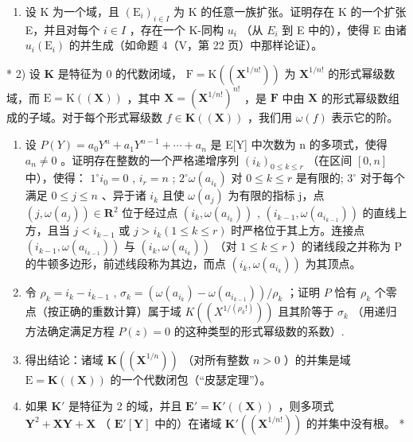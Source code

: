 \BourbakiExerciseGroup

\begin{enumerate}
\def\labelenumi{\arabic{enumi})}
\tightlist
\item
  设 K 为一个域，且 \((\mathrm{E}_{i})_{i\in I}\) 为 K 的任意一族扩张。证明存在 K 的一个扩张 E，并且对每个 \(i\in I\) ，存在一个 K-同构 \(u_{i}\) （从 \(E_{i}\) 到 E 中的），使得 E 由诸 \(u_{i}(\mathrm{E}_{i})\) 的并生成（如命题 4（V，第 22 页）中那样论证）。
\end{enumerate}

* 2) 设 \(\mathbf{K}\) 是特征为 0 的代数闭域， \(\mathrm{F} = \mathrm{K}((\mathbf{X}^{1 / n!}))\) 为 \(\mathbf{X}^{1 / n!}\) 的形式幂级数域，而 \(\mathrm{E} = \mathrm{K}((\mathbf{X}))\) ，其中 \(\mathbf{X} = (\mathbf{X}^{1 / n!})^{n!}\) ，是 \(\mathbf{F}\) 中由 \(\mathbf{X}\) 的形式幂级数组成的子域。对于每个形式幂级数 \(f \in \mathbf{K}((\mathbf{X}))\) ，我们用 \(\omega(f)\) 表示它的阶。

\begin{enumerate}
\def\labelenumi{\alph{enumi})}
\item
  设 \(P(Y) = a_{0}Y^{n} + a_{1}Y^{n-1} + \cdots + a_{n}\) 是 E{[}Y{]} 中次数为 n 的多项式，使得 \(a_{n} \neq 0\) 。证明存在整数的一个严格递增序列 \((i_{k})_{0 \leqslant k \leqslant r}\) （在区间 \([0, n]\) 中），使得： \(1^{\circ} i_{0} = 0\) , \(i_{r} = n\) ; \(2^{\circ} \omega(a_{i_{k}})\) 对 \(0 \leqslant k \leqslant r\) 是有限的; \(3^{\circ}\) 对于每个满足 \(0 \leqslant j \leqslant n\) 、异于诸 \(i_{k}\) 且使 \(\omega(a_{j})\) 为有限的指标 j，点 \((j, \omega(a_{j})) \in \mathbf{R}^{2}\) 位于经过点 \((i_{k}, \omega(a_{i_{k}}))\) , \((i_{k-1}, \omega(a_{i_{k-1}}))\) 的直线上方，且当 \(j < i_{k-1}\) 或 \(j > i_{k} (1 \leqslant k \leqslant r)\) 时严格位于其上方。连接点 \((i_{k-1}, \omega(a_{i_{k-1}}))\) 与 \((i_{k}, \omega(a_{i_{k}}))\) （对 \(1 \leqslant k \leqslant r\) ）的诸线段之并称为 P 的牛顿多边形，前述线段称为其边，而点 \((i_{k}, \omega(a_{i_{k}}))\) 为其顶点。
\item
  令 \(\rho_{k} = i_{k} - i_{k - 1}\) , \(\sigma_{k} = (\omega (a_{i_{k}}) - \omega (a_{i_{k - 1}})) / \rho_{k}\) ；证明 \(P\) 恰有 \(\rho_{k}\) 个零点（按正确的重数计算）属于域 \(K((X^{1 / (\rho_k!)}))\) 且其阶等于 \(\sigma_{k}\) （用递归方法确定满足方程 \(P(z) = 0\) 的这种类型的形式幂级数的系数）.
\item
  得出结论：诸域 \(\mathbf{K}((\mathbf{X}^{1 / n}))\) （对所有整数 \(n > 0\) ）的并集是域 \(\mathrm{E} = \mathbf{K}((\mathbf{X}))\) 的一个代数闭包（“皮瑟定理”）。
\item
  如果 \(\mathbf{K}'\) 是特征为 2 的域，并且 \(\mathbf{E}' = \mathbf{K}'((\mathbf{X}))\) ，则多项式 \(\mathbf{Y}^2 + \mathbf{X}\mathbf{Y} + \mathbf{X}\) （ \(\mathbf{E}'[\mathbf{Y}]\) 中的）在诸域 \(\mathbf{K}'((\mathbf{X}^{1/n!}))\) 的并集中没有根。 *
\end{enumerate}

